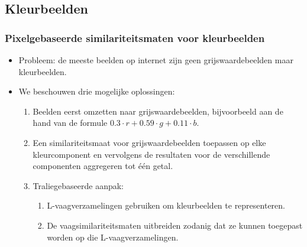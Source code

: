 \documentclass[dutch]{beamer}
\theoremstyle{definition}
\theoremstyle{remark}
\theoremstyle{example}
\begin{document}
\subsection{Kleurbeelden}
\frame
{
  \frametitle{Pixelgebaseerde similariteitsmaten voor kleurbeelden}
  
  \begin{itemize}
     \item Probleem: de meeste beelden op internet zijn 
     geen grijswaardebeelden maar kleurbeelden.
     \item We beschouwen drie mogelijke oplossingen:
     \begin{enumerate}
       \item Beelden eerst omzetten naar grijswaardebeelden, bijvoorbeeld aan de 
       hand van de formule $0.3 \cdot r + 0.59 \cdot g + 0.11 \cdot b$.
       \item Een similariteitsmaat voor grijswaardebeelden toepassen op elke
       kleurcomponent en vervolgens de resultaten voor de verschillende componenten
       aggregeren tot \'e\'en getal.
       \item Traliegebaseerde aanpak:
        \begin{enumerate}
          \item L-vaagverzamelingen gebruiken om kleurbeelden te representeren.
          \item De vaagsimilariteitsmaten uitbreiden zodanig dat ze kunnen
          toegepast worden op die L-vaagverzamelingen.
        \end{enumerate}
     \end{enumerate}
   \end{itemize}
}
\frame
\end{document}

